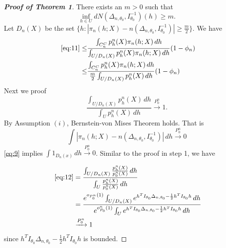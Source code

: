 \begin{proof}[\textbf{Proof of Theorem 1}]
    There exists an $m>0$ such that
\begin{equation}
    \inf_{h\in U} dN(\Delta_{n,\theta_0},I_{\theta_0}^{-1})(h)\geq m.
\end{equation}
Let $D_n(X)$ be the set $\{h: |\pi_{n}(h;X)-n(\Delta_{n,\theta_{0}},I_{\theta_{0}}^{-1})|\geq\frac{m}{2}\}$. We have
\begin{equation}\label{eq:13}
    \begin{aligned}~\eqref{eq:11}\leq&\frac{\int_{C_n^C}p_h^n(X)\pi_n(h;X)\, dh}{\int_{U/D_n(X)} p_h^n(X)\pi_n(h;X)\, dh}(1-\phi_n)\\
        \leq&\frac{\int_{C_n^C}p_h^n(X)\pi_n(h;X)\, dh}{\frac{m}{2}\int_{U/D_n(X)} p_h^n(X)\, dh}(1-\phi_n)\\
    \end{aligned}
\end{equation}
Next we proof
\begin{equation}\label{eq:12}
    \frac{\int_{U/D_n(X)} p_h^n(X)\, dh}{\int_U p_h^n(X)\, dh}\xrightarrow{P_0^n}1.
\end{equation}
By Assumption $(i)$, Bernstein-von Mises Theorem holds. That is
\begin{equation}\label{eq:9}
 \int |\pi_{n}(h;X)-n(\Delta_{n,\theta_{0}},I_{\theta_{0}}^{-1})|\, dh\xrightarrow{P_0^n}0   
\end{equation}
\eqref{eq:9} implies $\int 1_{D_n(x)}\, dh\xrightarrow{P_0^n}0$. Similar to the proof in step 1, we have

\begin{equation}
\begin{aligned}~\eqref{eq:12}&=\frac{\int_{U/D_n(X)} \frac{p_h^n(X)}{p_0^n(X)}\, dh}{\int_U \frac{p_h^n(X)}{p_0^n(X)}\, dh}\\
                 &=\frac{e^{o_{P^n_0}(1)}\int_{U/D_n(X)} e^{h^T I_{\theta_0}\Delta_{n,\theta_0}-\frac{1}{2}h^T I_{\theta_0}h} \, dh}{e^{o^n_{P_0}(1)}\int_U e^{h^T I_{\theta_0}\Delta_{n,\theta_0}-\frac{1}{2}h^T I_{\theta_0}h} \, dh}\\
                 &\xrightarrow{P_0^n} 1
\end{aligned}
\end{equation}
since $h^T I_{\theta_0}\Delta_{n,\theta_0}-\frac{1}{2}h^T I_{\theta_0}h$ is bounded.



\end{proof}
